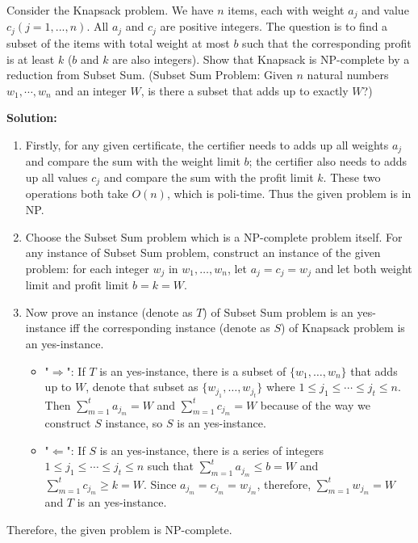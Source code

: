 \documentclass{article}
\begin{document}
Consider the Knapsack problem. We have $n$ items, each with weight $a_j$ and value $c_j (j = 1,..., n)$. All
$a_j$ and $c_j$ are positive integers. The question is to find a subset of the items with total weight at most $b$ such
that the corresponding profit is at least $k$ ($b$ and $k$ are also integers). Show that Knapsack is NP-complete
by a reduction from Subset Sum. (Subset Sum Problem: Given $n$ natural numbers $w_1,\cdots, w_n$ and an integer $W$, is there a subset that adds up to exactly $W$?)
{\color{blue}
\par\textbf{Solution: }
\begin{enumerate}
	\item Firstly, for any given certificate, the certifier needs to adds up all weights $a_j$ and compare the sum with the weight limit $b$; the certifier also needs to adds up all values $c_j$ and compare the sum with the profit limit $k$. These two operations both take $O(n)$, which is poli-time. Thus the given problem is in NP.
	\item Choose the Subset Sum problem which is a NP-complete problem itself. For any instance of Subset Sum problem, construct an instance of the given problem: for each integer $w_j$ in $w_1, \ldots, w_n$, let $a_j = c_j = w_j$ and let both weight limit and profit limit $b = k = W$.
	\item Now prove an instance (denote as $T$) of Subset Sum problem is an yes-instance iff the corresponding instance (denote as $S$) of Knapsack problem is an yes-instance.
	\begin{itemize}
		\item "$\Rightarrow$": If $T$ is an yes-instance,  there is a subset of $\{w_1, \ldots, w_n\}$ that adds up to $W$, denote that subset as $\{w_{j_1}, \ldots, w_{j_t}\}$ where $1 \leq j_1 \leq \cdots \leq j_t \leq n$. Then $\sum\limits_{m = 1}^t{a_{j_m}} = W$ and $\sum\limits_{m = 1}^t{c_{j_m}} = W$ because of the way we construct $S$ instance, so $S$ is an yes-instance.
		\item "$\Leftarrow$": If $S$ is an yes-instance, there is a series of integers $1 \leq j_1 \leq \cdots \leq j_t \leq n$ such that $\sum\limits_{m = 1}^t{a_{j_m}} \leq b = W$ and $\sum\limits_{m = 1}^t{c_{j_m}} \geq k = W$. Since $a_{j_m} = c_{j_m} = w_{j_m}$, therefore, $\sum\limits_{m = 1}^t{w_{j_m}} = W$ and $T$ is an yes-instance.
	\end{itemize}
\end{enumerate}
\par Therefore, the given problem is NP-complete.
}
\end{document}
